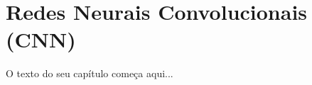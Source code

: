 
\chapter{Redes Neurais Convolucionais (CNN)}
\label{cap:cnn}

O texto do seu capítulo começa aqui...